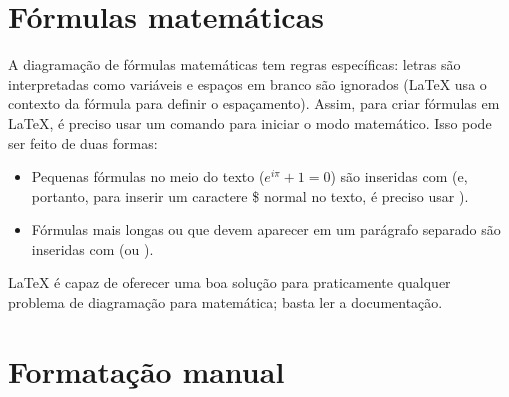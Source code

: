 \section{Fórmulas matemáticas}

A diagramação de fórmulas matemáticas tem regras específicas: letras são
interpretadas como variáveis e espaços em branco são ignorados (\LaTeX{}
usa o contexto da fórmula para definir o espaçamento). Assim, para criar
fórmulas em \LaTeX{}, é preciso usar um comando para iniciar o modo
matemático. Isso pode ser feito de duas formas:

\begin{itemize}
  \item Pequenas fórmulas no meio do texto ($e^{i\pi}+1=0$) são inseridas
  com  (e, portanto, para inserir um caractere \$
  normal no texto, é preciso usar \cmd{\sla{}\$}).

  \item Fórmulas mais longas ou que devem aparecer em um parágrafo
  separado são inseridas com  (ou
  ).
\end{itemize}

\LaTeX{} é capaz de oferecer uma boa solução para praticamente qualquer
problema de diagramação para matemática; basta ler a documentação.

\section{Formatação manual}

